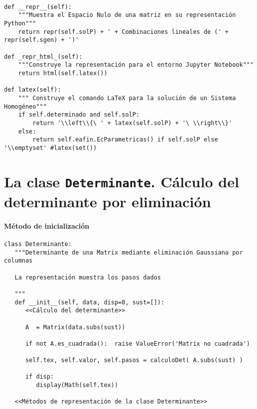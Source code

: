 \documentclass[11pt]{report}
\begin{document}
\begin{verbatim}

def __repr__(self):
    """Muestra el Espacio Nulo de una matriz en su representación Python"""
    return repr(self.solP) + ' + Combinaciones lineales de (' + repr(self.sgen) + ')'

def _repr_html_(self):
    """Construye la representación para el entorno Jupyter Notebook"""
    return html(self.latex())

def latex(self):
    """ Construye el comando LaTeX para la solución de un Sistema Homogéneo"""
    if self.determinado and self.solP:
        return '\\left\\{\ ' + latex(self.solP) + '\ \\right\\}'
    else:
        return self.eafin.EcParametricas() if self.solP else '\\emptyset' #latex(set())

\end{verbatim}


\part{La clase \texttt{Determinante}. Cálculo del determinante por eliminación}
\label{sec:org50aba36}

\subsection{Método de inicialización}
\label{sec:org04b5738}

\begin{verbatim}
class Determinante:
   """Determinante de una Matrix mediante eliminación Gaussiana por columnas
   
   La representación muestra los pasos dados
   
   """
   def __init__(self, data, disp=0, sust=[]):
      <<Cálculo del determinante>>
      
      A  = Matrix(data.subs(sust))
      
      if not A.es_cuadrada():  raise ValueError('Matrix no cuadrada')
      
      self.tex, self.valor, self.pasos = calculoDet( A.subs(sust) )
      
      if disp:
         display(Math(self.tex))

   <<Métodos de representación de la clase Determinante>>
         
\end{verbatim}
\end{document}
